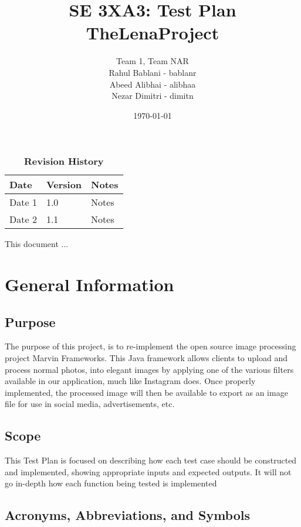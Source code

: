 \documentclass[12pt, titlepage]{article}
\title{SE 3XA3: Test Plan\\TheLenaProject}
\author{Team 1, Team NAR
		\\ Rahul Bablani - bablanr
		\\ Abeed Alibhai - alibhaa
		\\ Nezar Dimitri - dimitn
}
\date{\today}
\begin{document}
\maketitle

\tableofcontents
\listoftables
\listoffigures

\begin{table}[bp]
\caption{\bf Revision History}
\begin{tabularx}{\textwidth}{p{3cm}p{2cm}X}
\toprule {\bf Date} & {\bf Version} & {\bf Notes}\\
\midrule
Date 1 & 1.0 & Notes\\
Date 2 & 1.1 & Notes\\
\bottomrule
\end{tabularx}
\end{table}

\newpage


This document ...

\section{General Information}

\subsection{Purpose}

The purpose of this project, is to re-implement the open source image processing project Marvin Frameworks. This Java framework allows clients to upload and process normal photos, into elegant images by applying one of the various filters available in our application, much like Instagram does. Once properly implemented, the processed image will then be available to export as an image file for use in social media, advertisements, etc.

\subsection{Scope}

This Test Plan is focused on describing how each test case should be constructed and implemented, showing appropriate inputs and expected outputs. It will not go in-depth how each function being tested is implemented

\subsection{Acronyms, Abbreviations, and Symbols}
	
\end{document}

